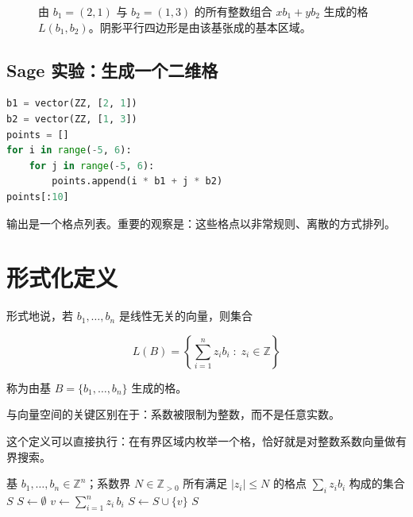 \begin{figure}[H]
\centering
{}
\caption{由 $b_1=(2,1)$ 与 $b_2=(1,3)$ 的所有整数组合 $xb_1+yb_2$ 生成的格 $L(b_1,b_2)$。阴影平行四边形是由该基张成的基本区域。}
\label{fig:lattice-basic}
\end{figure}

\subsection{Sage 实验：生成一个二维格}

\begin{lstlisting}[language=Python]
b1 = vector(ZZ, [2, 1])
b2 = vector(ZZ, [1, 3])
points = []
for i in range(-5, 6):
    for j in range(-5, 6):
        points.append(i * b1 + j * b2)
points[:10]
\end{lstlisting}

输出是一个格点列表。重要的观察是：这些格点以非常规则、离散的方式排列。

\section{形式化定义}
形式地说，若 $b_1, \ldots, b_n$ 是线性无关的向量，则集合

\[
L(B) = \left\{ \sum_{i=1}^{n} z_i b_i \;:\; z_i \in \mathbb{Z} \right\}
\]

称为由基 $B = \{b_1, \ldots, b_n\}$ 生成的格。

与向量空间的关键区别在于：系数被限制为整数，而不是任意实数。

这个定义可以直接执行：在有界区域内枚举一个格，恰好就是对整数系数向量做有界搜索。

\begin{algorithm}[H]
\caption{有界格点枚举}
\label{alg:lattice-enum}
\begin{algorithmic}[1]
\Require 基 $b_1,\dots,b_n \in \mathbb{Z}^n$；系数界 $N \in \mathbb{Z}_{>0}$
\Ensure 所有满足 $|z_i| \le N$ 的格点 $\sum_i z_i b_i$ 构成的集合 $S$
\State $S \gets \emptyset$
    \State $v \gets \sum_{i=1}^{n} z_i \, b_i$
    \State $S \gets S \cup \{v\}$
\EndFor
\State \Return $S$
\end{algorithmic}
\end{algorithm}

